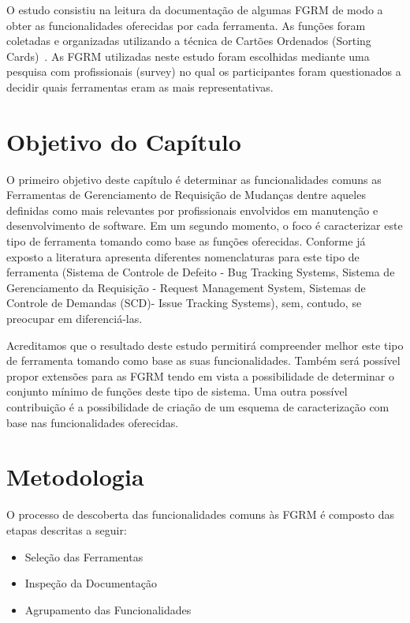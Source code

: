 O estudo consistiu na leitura da documentação de algumas FGRM de modo a obter as
funcionalidades oferecidas por cada ferramenta. As funções foram coletadas e
organizadas utilizando a técnica de Cartões Ordenados (Sorting
Cards)~\cite{5070993}. As FGRM utilizadas neste estudo foram escolhidas mediante
uma pesquisa com profissionais (survey) no qual os participantes foram
questionados a decidir quais ferramentas eram as mais representativas.


\section{Objetivo do Capítulo}
\label{sec:objetivo_do_capítulo}

O primeiro objetivo deste capítulo é determinar as funcionalidades comuns as
Ferramentas de Gerenciamento de Requisição de Mudanças dentre aqueles definidas
como mais relevantes por profissionais envolvidos em manutenção e
desenvolvimento de software. Em um segundo momento, o foco é caracterizar este
tipo de ferramenta tomando como base as funções oferecidas.  Conforme já exposto
a literatura apresenta diferentes nomenclaturas para este tipo de ferramenta
(Sistema de Controle de Defeito - Bug Tracking Systems, Sistema de Gerenciamento
da Requisição - Request Management System, Sistemas de Controle de Demandas
(SCD)- Issue Tracking Systems), sem, contudo, se preocupar em diferenciá-las.

Acreditamos que o resultado deste estudo permitirá compreender melhor este tipo
de ferramenta tomando como base as suas funcionalidades. Também será possível
propor extensões para as FGRM tendo em vista a possibilidade de determinar o
conjunto mínimo de funções deste tipo de sistema. Uma outra possível
contribuição é a possibilidade de criação de um esquema de caracterização com
base nas funcionalidades oferecidas.

\section{Metodologia}
\label{sec:metodologia}

O processo de descoberta das funcionalidades comuns às FGRM é composto das
etapas descritas a seguir:

\begin{itemize}
	\item Seleção das Ferramentas
	\item Inspeção da Documentação
	\item Agrupamento das Funcionalidades
\end{itemize}

